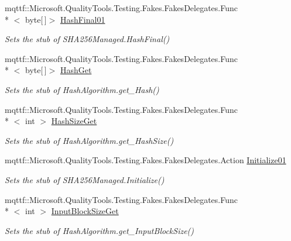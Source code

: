 \begin{DoxyCompactItemize}
mqttf\-::\-Microsoft.\-Quality\-Tools.\-Testing.\-Fakes.\-Fakes\-Delegates.\-Func\\*
$<$ byte\mbox{[}$\,$\mbox{]}$>$ \hyperlink{class_system_1_1_security_1_1_cryptography_1_1_fakes_1_1_stub_s_h_a256_managed_a6d9644f885a2ad8ef5bac869569c5cba}{Hash\-Final01}
\begin{DoxyCompactList}\small\item\em Sets the stub of S\-H\-A256\-Managed.\-Hash\-Final()\end{DoxyCompactList}\item 
mqttf\-::\-Microsoft.\-Quality\-Tools.\-Testing.\-Fakes.\-Fakes\-Delegates.\-Func\\*
$<$ byte\mbox{[}$\,$\mbox{]}$>$ \hyperlink{class_system_1_1_security_1_1_cryptography_1_1_fakes_1_1_stub_s_h_a256_managed_a1be8ff104c2db244d0a3ebaa54e890dd}{Hash\-Get}
\begin{DoxyCompactList}\small\item\em Sets the stub of Hash\-Algorithm.\-get\-\_\-\-Hash()\end{DoxyCompactList}\item 
mqttf\-::\-Microsoft.\-Quality\-Tools.\-Testing.\-Fakes.\-Fakes\-Delegates.\-Func\\*
$<$ int $>$ \hyperlink{class_system_1_1_security_1_1_cryptography_1_1_fakes_1_1_stub_s_h_a256_managed_a9a023a51c84e9a9acf4239e1e06cdc97}{Hash\-Size\-Get}
\begin{DoxyCompactList}\small\item\em Sets the stub of Hash\-Algorithm.\-get\-\_\-\-Hash\-Size()\end{DoxyCompactList}\item 
mqttf\-::\-Microsoft.\-Quality\-Tools.\-Testing.\-Fakes.\-Fakes\-Delegates.\-Action \hyperlink{class_system_1_1_security_1_1_cryptography_1_1_fakes_1_1_stub_s_h_a256_managed_aa03f3451492495a81f28d0e6da7a159a}{Initialize01}
\begin{DoxyCompactList}\small\item\em Sets the stub of S\-H\-A256\-Managed.\-Initialize()\end{DoxyCompactList}\item 
mqttf\-::\-Microsoft.\-Quality\-Tools.\-Testing.\-Fakes.\-Fakes\-Delegates.\-Func\\*
$<$ int $>$ \hyperlink{class_system_1_1_security_1_1_cryptography_1_1_fakes_1_1_stub_s_h_a256_managed_ae17fb6f6ebdf7beffdecfad20b2eebe1}{Input\-Block\-Size\-Get}
\begin{DoxyCompactList}\small\item\em Sets the stub of Hash\-Algorithm.\-get\-\_\-\-Input\-Block\-Size()\end{DoxyCompactList}\item 

\end{DoxyCompactItemize}
